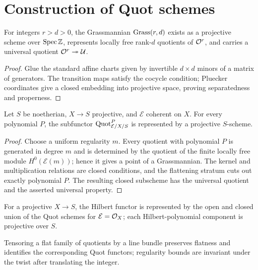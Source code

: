 \section{Construction of Quot schemes}
\begin{theorem}\label{fga-thm-5-14}
For integers $r>d>0$, the Grassmannian $\operatorname{Grass}(r,d)$ exists as a projective
scheme over $\operatorname{Spec}\mathbb Z$, represents locally free rank-$d$ quotients of
$\mathcal O^r$, and carries a universal quotient $\mathcal O^r\twoheadrightarrow\mathcal U$.
\end{theorem}
\begin{proof}
Glue the standard affine charts given by invertible $d\times d$ minors of a
matrix of generators.  The transition maps satisfy the cocycle condition;
Pluecker coordinates give a closed embedding into projective space, proving
separatedness and properness.
\end{proof}
\begin{theorem}\label{fga-thm-5-15}
Let $S$ be noetherian, $X\to S$ projective, and $\mathcal E$ coherent on $X$.
For every polynomial $P$, the subfunctor $\operatorname{Quot}^P_{\mathcal E/X/S}$ is
represented by a projective $S$-scheme.
\end{theorem}
\begin{proof}
Choose a uniform regularity $m$.  Every quotient with polynomial $P$ is
generated in degree $m$ and is determined by the quotient of the finite locally
free module $H^0(\mathcal E(m))$; hence it gives a point of a Grassmannian.
The kernel and multiplication relations are closed conditions, and the
flattening stratum cuts out exactly polynomial $P$.  The resulting closed
subscheme has the universal quotient and the asserted universal property.
\end{proof}
\begin{theorem}\label{fga-thm-5-16}
For a projective $X\to S$, the Hilbert functor is represented by the open and
closed union of the Quot schemes for $\mathcal E=\mathcal O_X$; each Hilbert-polynomial
component is projective over $S$.
\end{theorem}
\begin{lemma}\label{fga-lem-5-17}
Tensoring a flat family of quotients by a line bundle preserves flatness and
identifies the corresponding Quot functors; regularity bounds are invariant
under the twist after translating the integer.
\end{lemma}
